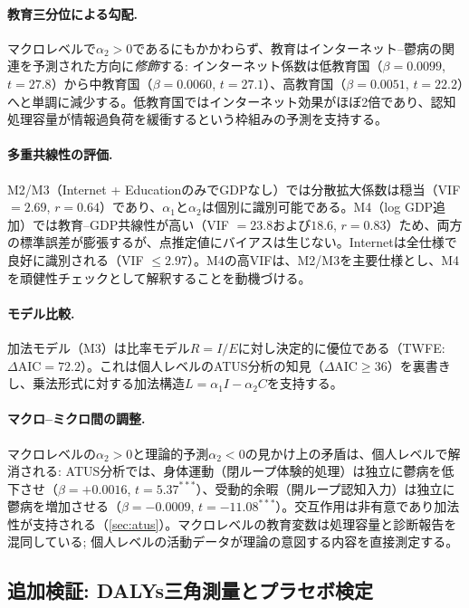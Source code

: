\documentclass[a4paper,11pt,titlepage]{article}
\begin{document}
\paragraph{教育三分位による勾配.} マクロレベルで$\alpha_2 > 0$であるにもかかわらず、教育はインターネット--鬱病の関連を予測された方向に\textit{修飾}する: インターネット係数は低教育国（$\beta = 0.0099$, $t = 27.8$）から中教育国（$\beta = 0.0060$, $t = 27.1$）、高教育国（$\beta = 0.0051$, $t = 22.2$）へと単調に減少する。低教育国ではインターネット効果がほぼ2倍であり、認知処理容量が情報過負荷を緩衝するという枠組みの予測を支持する。

\paragraph{多重共線性の評価.} M2/M3（Internet + EducationのみでGDPなし）では分散拡大係数は穏当（VIF $= 2.69$, $r = 0.64$）であり、$\alpha_1$と$\alpha_2$は個別に識別可能である。M4（log GDP追加）では教育--GDP共線性が高い（VIF $= 23.8$および$18.6$, $r = 0.83$）ため、両方の標準誤差が膨張するが、点推定値にバイアスは生じない。Internetは全仕様で良好に識別される（VIF $\leq 2.97$）。M4の高VIFは、M2/M3を主要仕様とし、M4を頑健性チェックとして解釈することを動機づける。

\paragraph{モデル比較.} 加法モデル（M3）は比率モデル$R = I/E$に対し決定的に優位である（TWFE: $\Delta\text{AIC} = 72.2$）。これは個人レベルのATUS分析の知見（$\Delta\text{AIC} \geq 36$）を裏書きし、乗法形式に対する加法構造$L = \alpha_1 I - \alpha_2 C$を支持する。

\paragraph{マクロ--ミクロ間の調整.} マクロレベルの$\alpha_2 > 0$と理論的予測$\alpha_2 < 0$の見かけ上の矛盾は、個人レベルで解消される: ATUS分析では、身体運動（閉ループ体験的処理）は独立に鬱病を低下させ（$\beta = +0.0016$, $t = 5.37^{***}$）、受動的余暇（開ループ認知入力）は独立に鬱病を増加させる（$\beta = -0.0009$, $t = -11.08^{***}$）。交互作用は非有意であり加法性が支持される（\cref{sec:atus}）。マクロレベルの教育変数は処理容量と診断報告を混同している; 個人レベルの活動データが理論の意図する内容を直接測定する。


\subsection{追加検証: DALYs三角測量とプラセボ検定}\label{sec:dalys-placebo}
\end{document}
